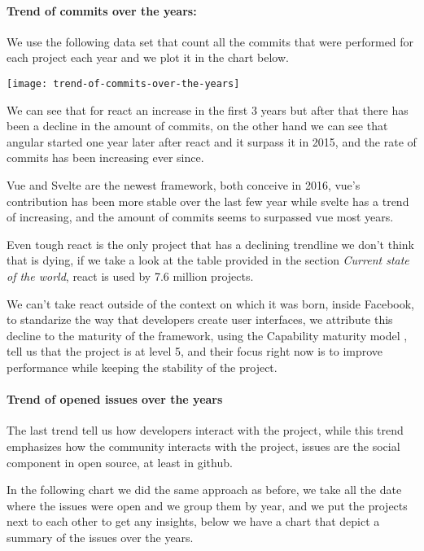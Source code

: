 \paragraph{Trend of commits over the years:} We use the following data set \cite{trend-of-commits-over-the-years} that count all the commits that were performed for each project each year and we plot it in the chart below.
\begin{center}
    \texttt{[image: trend-of-commits-over-the-years]}    
\end{center}

We can see that for react an increase in the first 3 years but after that there has been a decline in the amount of commits, on the other hand we can see that angular started one year later after react and it surpass it in 2015, and the rate of commits has been increasing ever since.

Vue and Svelte are the newest framework, both conceive in 2016, vue's contribution has been more stable over the last few year while svelte has a trend of increasing, and the amount of commits seems to surpassed vue most years.

Even tough react is the only project that has a declining trendline we don't think that is dying, if we take a look at the table provided in the section \textit{Current state of the world}, react is used by 7.6 million projects.

We can't take react outside of the context on which it was born, inside Facebook, to standarize the way that developers create user interfaces, we attribute this decline to the maturity of the framework, using the Capability maturity model \cite{cmm}, tell us that the project is at level 5, and their focus right now is to improve performance while keeping the stability of the project.

\paragraph{Trend of opened issues over the years}
The last trend tell us how developers interact with the project, while this trend emphasizes how the community interacts with the project, issues are the social component in open source, at least in github.

In the following chart we did the same approach as before, we take all the date where the issues were open and we group them by year, and we put the projects next to each other to get any insights, below we have a chart that depict a summary of the issues over the years.

